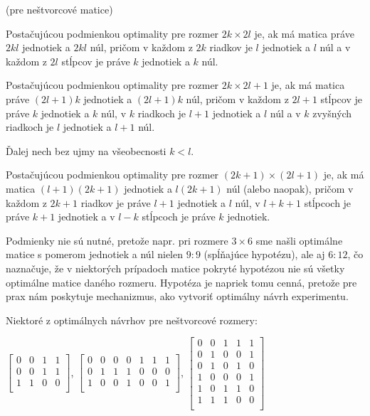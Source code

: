 \begin{hypoteza}
\label{hypoteza2}
(pre neštvorcové matice)

Postačujúcou podmienkou optimality pre rozmer $2k \times 2l$ je, ak má matica práve $2kl$ jednotiek a $2kl$ núl, 
pričom v každom z $2k$ riadkov je $l$ jednotiek a $l$ núl a v každom z $2l$ stĺpcov je práve $k$ jednotiek a $k$ núl.

Postačujúcou podmienkou optimality pre rozmer $2k \times 2l + 1$ je, ak má matica práve $(2l + 1)k$ jednotiek a $(2l + 1)k$ núl, 
pričom v každom z $2l + 1$ stĺpcov je práve $k$ jednotiek a $k$ núl, v $k$ riadkoch je $l + 1$ jednotiek a $l$ núl 
a v $k$ zvyšných riadkoch je $l$ jednotiek a $l + 1$ núl.

Ďalej nech bez ujmy na všeobecnosti $k < l$.

Postačujúcou podmienkou optimality pre rozmer $(2k + 1) \times (2l + 1)$ je, 
ak má matica $(l + 1)(2k + 1)$ jednotiek a $l(2k + 1)$ núl (alebo naopak), 
pričom v každom z $2k + 1$ riadkov je práve $l + 1$ jednotiek a $l$ núl, v $l + k + 1$ stĺpcoch je práve $k + 1$
jednotiek a v $l - k$ stĺpcoch je práve $k$ jednotiek.
\end{hypoteza}

\begin{com}
Podmienky nie sú nutné, pretože napr. pri rozmere $3 \times 6$ sme našli optimálne matice s pomerom jednotiek a núl
nielen $9:9$ (spĺňajúce hypotézu), ale aj $6:12$, čo naznačuje, 
že v niektorých prípadoch matice pokryté hypotézou nie sú všetky optimálne matice daného rozmeru. 
Hypotéza je napriek tomu cenná, pretože pre prax nám poskytuje mechanizmus, ako vytvoriť optimálny návrh experimentu.
\end{com}

Niektoré z optimálnych návrhov pre neštvorcové rozmery:

\begin{center}
$
\begin{bmatrix}
0 & 0 & 1 & 1 \\
0 & 0 & 1 & 1 \\
1 & 1 & 0 & 0 \\
\end{bmatrix}
$,
$
\begin{bmatrix}
0 & 0 & 0 & 0 & 1 & 1 & 1 \\
0 & 1 & 1 & 1 & 0 & 0 & 0 \\
1 & 0 & 0 & 1 & 0 & 0 & 1 \\
\end{bmatrix}
$,
$
\begin{bmatrix}
0 & 0 & 1 & 1 & 1 \\ 
0 & 1 & 0 & 0 & 1 \\ 
0 & 1 & 0 & 1 & 0 \\ 
1 & 0 & 0 & 0 & 1 \\ 
1 & 0 & 1 & 1 & 0 \\ 
1 & 1 & 1 & 0 & 0 \\ 
\end{bmatrix}
$
\end{center}

